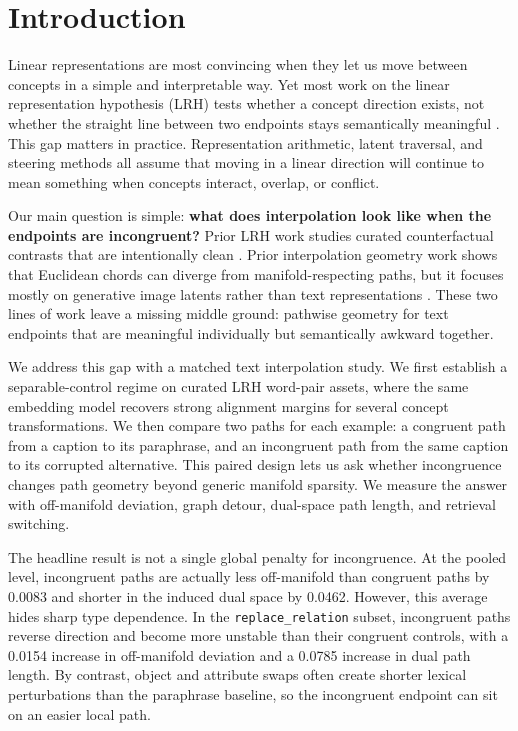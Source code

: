 \section{Introduction}
\label{sec:intro}

Linear representations are most convincing when they let us move between concepts in a simple and interpretable way. Yet most work on the linear representation hypothesis (LRH) tests whether a concept direction exists, not whether the straight line between two endpoints stays semantically meaningful \cite{park2024lrh,park2025categorical}. This gap matters in practice. Representation arithmetic, latent traversal, and steering methods all assume that moving in a linear direction will continue to mean something when concepts interact, overlap, or conflict.

Our main question is simple: {\bf what does interpolation look like when the endpoints are incongruent?} Prior LRH work studies curated counterfactual contrasts that are intentionally clean \cite{park2024lrh,park2025categorical}. Prior interpolation geometry work shows that Euclidean chords can diverge from manifold-respecting paths, but it focuses mostly on generative image latents rather than text representations \cite{shao2017riemannian,struski2019feature,michelis2021linear}. These two lines of work leave a missing middle ground: pathwise geometry for text endpoints that are meaningful individually but semantically awkward together.

We address this gap with a matched text interpolation study. We first establish a separable-control regime on curated LRH word-pair assets, where the same embedding model recovers strong alignment margins for several concept transformations. We then compare two paths for each \sugarcrepe example: a congruent path from a caption to its paraphrase, and an incongruent path from the same caption to its corrupted alternative. This paired design lets us ask whether incongruence changes path geometry beyond generic manifold sparsity. We measure the answer with off-manifold deviation, graph detour, dual-space path length, and retrieval switching.

The headline result is not a single global penalty for incongruence. At the pooled level, incongruent paths are actually less off-manifold than congruent paths by 0.0083 and shorter in the induced dual space by 0.0462. However, this average hides sharp type dependence. In the \texttt{replace\_relation} subset, incongruent paths reverse direction and become more unstable than their congruent controls, with a 0.0154 increase in off-manifold deviation and a 0.0785 increase in dual path length. By contrast, object and attribute swaps often create shorter lexical perturbations than the paraphrase baseline, so the incongruent endpoint can sit on an easier local path.

